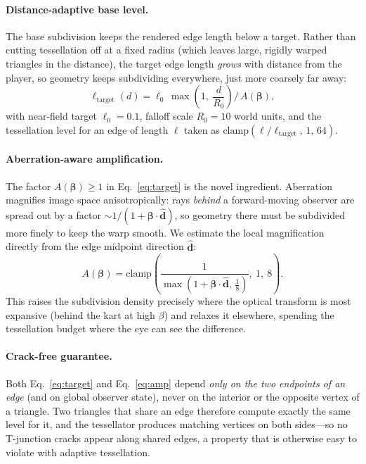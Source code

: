 \documentclass[aip,amsmath,amssymb,reprint,nofootinbib]{revtex4-2}
\begin{document}
\paragraph{Distance-adaptive base level.}
The base subdivision keeps the rendered edge length below a target. Rather than
cutting tessellation off at a fixed radius (which leaves large, rigidly warped
triangles in the distance), the target edge length \emph{grows} with distance
from the player, so geometry keeps subdividing everywhere, just more coarsely far
away:
\begin{equation}
\ell_{\mathrm{target}}(d) = \ell_0 \,\max\!\left(1,\ \frac{d}{R_0}\right)
\Big/\, A(\bm{\beta}),
\label{eq:target}
\end{equation}
with near-field target $\ell_0 = 0.1$, falloff scale $R_0 = 10$ world units, and
the tessellation level for an edge of length $\ell$ taken as
$\mathrm{clamp}(\ell/\ell_{\mathrm{target}},\,1,\,64)$.

\paragraph{Aberration-aware amplification.}
The factor $A(\bm{\beta})\ge 1$ in Eq.~\eqref{eq:target} is the novel ingredient.
Aberration magnifies image space anisotropically: rays \emph{behind} a forward-moving
observer are spread out by a factor $\sim 1/(1+\bm{\beta}\!\cdot\!\hat{\bm{d}})$, so
geometry there must be subdivided more finely to keep the warp smooth. We estimate
the local magnification directly from the edge midpoint direction $\hat{\bm{d}}$:
\begin{equation}
A(\bm{\beta}) = \mathrm{clamp}\!\left(
  \frac{1}{\max(1+\bm{\beta}\!\cdot\!\hat{\bm{d}},\,\tfrac18)},\ 1,\ 8\right).
\label{eq:amp}
\end{equation}
This raises the subdivision density precisely where the optical transform is most
expansive (behind the kart at high $\beta$) and relaxes it elsewhere, spending the
tessellation budget where the eye can see the difference.

\paragraph{Crack-free guarantee.}
Both Eq.~\eqref{eq:target} and Eq.~\eqref{eq:amp} depend \emph{only on the two
endpoints of an edge} (and on global observer state), never on the interior or
the opposite vertex of a triangle. Two triangles that share an edge therefore
compute exactly the same level for it, and the tessellator produces matching
vertices on both sides---so no T-junction cracks appear along shared edges, a
property that is otherwise easy to violate with adaptive tessellation.
\end{document}
